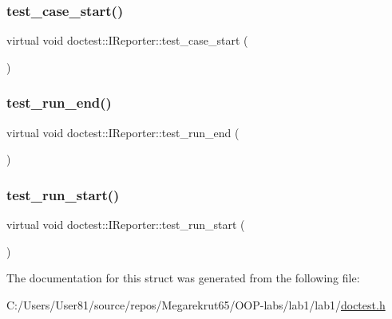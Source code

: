 \subsubsection{\texorpdfstring{test\+\_\+case\+\_\+start()}{test\_case\_start()}}
{\footnotesize\ttfamily virtual void doctest\+::\+I\+Reporter\+::test\+\_\+case\+\_\+start (\begin{DoxyParamCaption}\item[{const \mbox{\hyperlink{structdoctest_1_1_test_case_data}{Test\+Case\+Data}} \&}]{ }\end{DoxyParamCaption})\hspace{0.3cm}{\ttfamily [pure virtual]}}

\mbox{\label{structdoctest_1_1_i_reporter_a610495b7caa29e36b5ea62bff62952ed}} 
\subsubsection{\texorpdfstring{test\+\_\+run\+\_\+end()}{test\_run\_end()}}
{\footnotesize\ttfamily virtual void doctest\+::\+I\+Reporter\+::test\+\_\+run\+\_\+end (\begin{DoxyParamCaption}\item[{const \mbox{\hyperlink{structdoctest_1_1_test_run_stats}{Test\+Run\+Stats}} \&}]{ }\end{DoxyParamCaption})\hspace{0.3cm}{\ttfamily [pure virtual]}}

\mbox{\label{structdoctest_1_1_i_reporter_a7f4a4b654726d4b266c91cc0e1569f96}} 
\subsubsection{\texorpdfstring{test\+\_\+run\+\_\+start()}{test\_run\_start()}}
{\footnotesize\ttfamily virtual void doctest\+::\+I\+Reporter\+::test\+\_\+run\+\_\+start (\begin{DoxyParamCaption}{ }\end{DoxyParamCaption})\hspace{0.3cm}{\ttfamily [pure virtual]}}



The documentation for this struct was generated from the following file\+:\begin{DoxyCompactItemize}
\item 
C\+:/\+Users/\+User81/source/repos/\+Megarekrut65/\+O\+O\+P-\/labs/lab1/lab1/\mbox{\hyperlink{doctest_8h}{doctest.\+h}}\end{DoxyCompactItemize}
